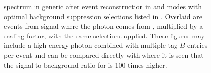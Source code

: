 \begin{figure}[hbtp!]
    \centering
    \caption{\label{fig:spectrum_after_optimisation}
    \BtoXsgamma spectrum in generic \MC after event reconstruction in \feiBp and \feiBz modes with optimal background suppression selections listed in .
    Overlaid are events from signal \MC where the photon comes from \BtoXsgamma, multiplied by a scaling factor, with the same selections applied.
    These figures may include a high energy photon combined with multiple tag-$B$ entries per event and can be compared directly with  where it is seen that
    the signal-to-background ratio for \BtoXsgamma is 100 times higher.}
\end{figure}

